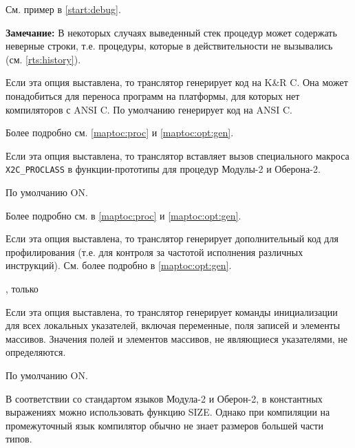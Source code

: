 \begin{description}
См. пример в \ref{start:debug}.

\ifgencode
{\bf Замечание:} В некоторых случаях выведенный стек процедур
может содержать неверные строки, т.е. процедуры, которые в действительности 
не вызывались (см. \ref{rts:history}).
\fi

\ifgenc
{}
        \MLBegin{}\ModeC{}\MLEnd{} \header

Если эта опция выставлена, то транслятор генерирует код на K\&R C.
Она может понадобиться для переноса программ на платформы, для которых
нет компиляторов с ANSI C. По умолчанию
\xds{} генерирует код на ANSI C.

Более подробно см. \ref{maptoc:proc} и \ref{maptoc:opt:gen}.
\fi

\ifgenc
{}
        \MLBegin{}\ModeC{}\MLEnd{} \header

Если эта опция выставлена, то транслятор вставляет вызов специального
макроса \verb|X2C_PROCLASS| в функции-прототипы для процедур Модулы-2 и
Оберона-2.

По умолчанию ON.

Более подробно см. в \ref{maptoc:proc} и \ref{maptoc:opt:gen}.
\fi

\ifgenc
{}
        \MLBegin{}\ModeC{}\MLEnd{} \header

Если эта опция выставлена, то транслятор 
генерирует дополнительный код для профилирования (т.е. для контроля
за частотой исполнения различных инструкций). 
См. более подробно в \ref{maptoc:opt:gen}.
\fi

\ifgencode
{}
        \MLBegin{}\ModeC{}, только \ot{} \MLEnd{} \header

Если эта опция выставлена, то транслятор генерирует команды 
инициализации для всех локальных указателей, включая переменные,
поля записей и элементы массивов. Значения полей и элементов
массивов, не являющиеся указателями, не определяются.

По умолчанию ON.
\fi

\ifgenc
{}
        \MLBegin{}\ModeC{}\MLEnd{} \header

В соответствии со стандартом языков Модула-2 и Оберон-2,
в константных выражениях можно использовать функцию SIZE.
Однако при компиляции на промежуточный язык компилятор обычно не
знает размеров большей части типов. 


\end{description}
